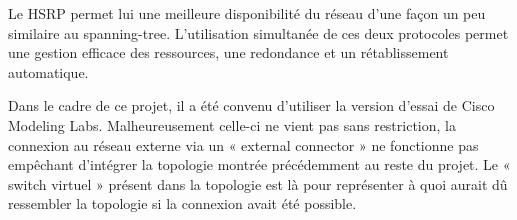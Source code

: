 Le HSRP permet lui une meilleure disponibilité du réseau d'une façon un peu similaire au
spanning-tree. L'utilisation simultanée de ces deux protocoles permet une gestion efficace des
ressources, une redondance et un rétablissement automatique.

Dans le cadre de ce projet, il a été convenu d'utiliser la version d'essai de Cisco Modeling Labs.
Malheureusement celle-ci ne vient pas sans restriction, la connexion au réseau externe via un
« external connector » ne fonctionne pas empêchant d'intégrer la topologie montrée
précédemment au reste du projet. Le « switch virtuel » présent dans la topologie est là pour
représenter à quoi aurait dû ressembler la topologie si la connexion avait été possible.
